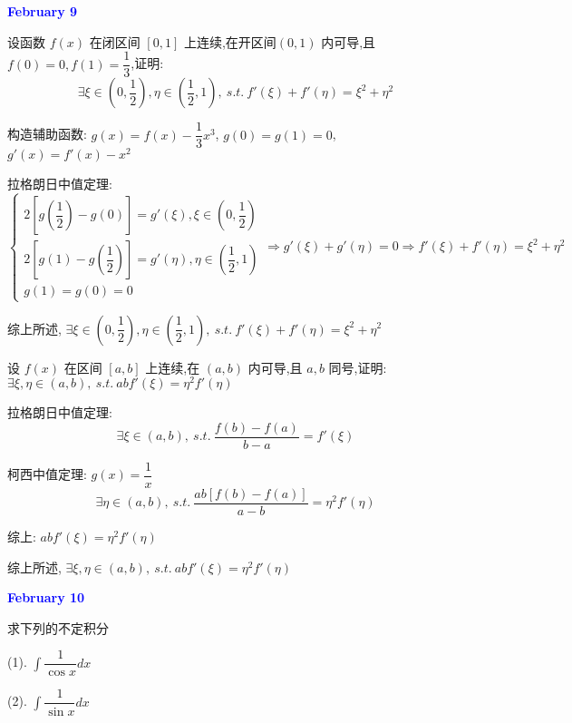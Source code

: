 \textcolor{blue}{\textbf{February 9}}

\begin{example}[][Exam: 28.2.3]
	设函数 $f(x)$ 在闭区间 $[0,1]$ 上连续,在开区间$(0,1)$ 内可导,且$f(0)=0,f(1)=\dfrac{1}{3}$,证明:
	$$\exists \xi\in\left(0,\dfrac{1}{2}\right),\eta\in\left( \dfrac{1}{2},1\right),\ s.t.\ f'(\xi)+f'(\eta)=\xi^{2}+\eta^{2}$$
\end{example}
\begin{solution}

	构造辅助函数: $g(x) = f(x) - \dfrac{1}{3}x^{3}$, $g(0) = g(1) = 0$, $g'(x) =f'(x) -x^{2}$

	拉格朗日中值定理:
	$$\begin{cases}
		2[g(\dfrac{1}{2})-g(0)] = g'(\xi), \xi\in(0,\dfrac{1}{2})\\
		2[g(1)-g(\dfrac{1}{2})] = g'(\eta), \eta\in(\dfrac{1}{2},1)\\
		g(1) = g(0) = 0
	\end{cases}\Rightarrow g'(\xi) + g'(\eta) = 0\Rightarrow f'(\xi) + f'(\eta) =\xi^{2} +\eta^{2}$$

	综上所述, $\exists \xi\in\left(0,\dfrac{1}{2}\right),\eta\in\left( \dfrac{1}{2},1\right),\ s.t.\ f'(\xi)+f'(\eta)=\xi^{2}+\eta^{2}$
\end{solution}

\begin{example}[][Exam: 28.2.4]
	设 $f(x)$ 在区间 $[a,b]$ 上连续,在 $(a,b)$ 内可导,且 $a,b$ 同号,证明:
	$\exists \xi,\eta\in(a,b),\ s.t.\ abf'(\xi)=\eta^{2}f'(\eta)$
\end{example}

\begin{solution}

	拉格朗日中值定理:
	$$\exists \xi\in (a,b),\ s.t.\ \dfrac{f(b)-f(a)}{b-a} = f'(\xi)$$

	柯西中值定理: $g(x) = \dfrac{1}{x}$
	$$\exists \eta\in(a,b),\ s.t.\ \dfrac{ab[f(b)-f(a)]}{a-b} = \eta^{2}f'(\eta)$$

	综上: $abf'(\xi) = \eta^{2}f'(\eta)$

	综上所述, $\exists \xi,\eta\in(a,b),\ s.t.\ abf'(\xi)=\eta^{2}f'(\eta)$
\end{solution}

\textcolor{blue}{\textbf{February 10}}

\begin{example}[][Exam: 28.2.5]
	求下列的不定积分

(1). $\displaystyle{\int \dfrac{1}{\cos x}dx}$

(2). $\displaystyle{\int \dfrac{1}{\sin x}dx}$
\end{example}

